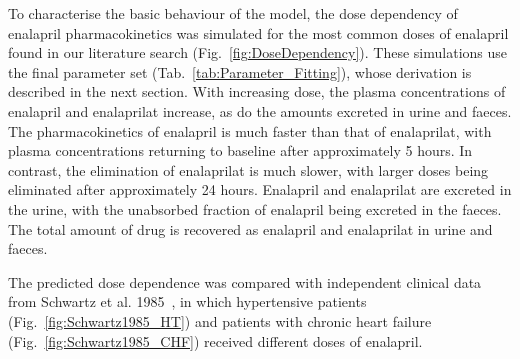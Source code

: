 \documentclass[pharmaceutics,article,submit,pdftex,moreauthors]{Definitions/mdpi}
\begin{document}
To characterise the basic behaviour of the model, the dose dependency of enalapril pharmacokinetics was simulated for the most common doses of enalapril found in our literature search (Fig.~\ref{fig:DoseDependency}). These simulations use the final parameter set (Tab.~\ref{tab:Parameter_Fitting}), whose derivation is described in the next section. With increasing dose, the plasma concentrations of enalapril and enalaprilat increase, as do the amounts excreted in urine and faeces. The pharmacokinetics of enalapril is much faster than that of enalaprilat, with plasma concentrations returning to baseline after approximately 5 hours. In contrast, the elimination of enalaprilat is much slower, with larger doses being eliminated after approximately 24 hours. Enalapril and enalaprilat are excreted in the urine, with the unabsorbed fraction of enalapril being excreted in the faeces. The total amount of drug is recovered as enalapril and enalaprilat in urine and faeces.


The predicted dose dependence was compared with independent clinical data from Schwartz et al. 1985~\cite{Schwartz1985}, in which hypertensive patients (Fig.~\ref{fig:Schwartz1985_HT}) and patients with chronic heart failure (Fig.~\ref{fig:Schwartz1985_CHF}) received different doses of enalapril.



\end{document}
